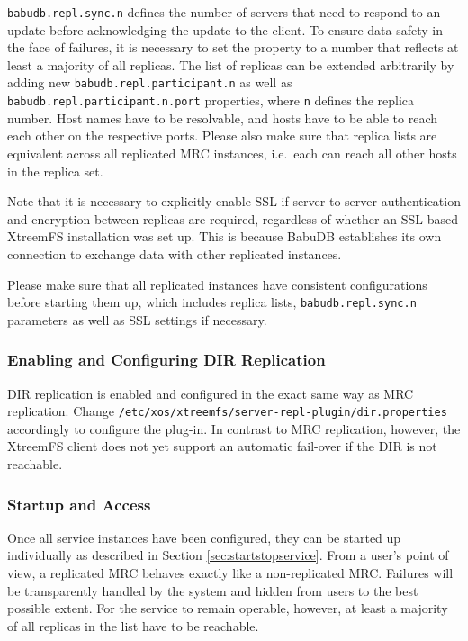 \documentclass[a4paper,10pt]{book}
\begin{document}
\texttt{babudb.repl.sync.n} defines the number of servers that need to respond to an update before acknowledging the update to the client. To ensure data safety in the face of failures, it is necessary to set the property to a number that reflects at least a majority of all replicas. The list of replicas can be extended arbitrarily by adding new \texttt{babudb.repl.participant.n} as well as \texttt{babudb.repl.participant.n.port} properties, where \texttt{n} defines the replica number. Host names have to be resolvable, and hosts have to be able to reach each other on the respective ports. Please also make sure that replica lists are equivalent across all replicated MRC instances, i.e.\ each can reach all other hosts in the replica set.

Note that it is necessary to explicitly enable SSL if server-to-server authentication and encryption between replicas are required, regardless of whether an SSL-based XtreemFS installation was set up. This is because BabuDB establishes its own connection to exchange data with other replicated instances.

Please make sure that all replicated instances have consistent configurations before starting them up, which includes replica lists, \texttt{babudb.repl.sync.n} parameters as well as SSL settings if necessary.

\subsubsection{Enabling and Configuring DIR Replication}
DIR replication is enabled and configured in the exact same way as MRC replication. Change \texttt{/etc/xos/xtreemfs/server-repl-plugin/dir.properties} accordingly to configure the plug-in. In contrast to MRC replication, however, the XtreemFS client does not yet support an automatic fail-over if the DIR is not reachable.

\subsubsection{Startup and Access}
Once all service instances have been configured, they can be started up individually as described in Section \ref{sec:startstopservice}. From a user's point of view, a replicated MRC behaves exactly like a non-replicated MRC. Failures will be transparently handled by the system and hidden from users to the best possible extent. For the service to remain operable, however, at least a majority of all replicas in the list have to be reachable.
\end{document}
